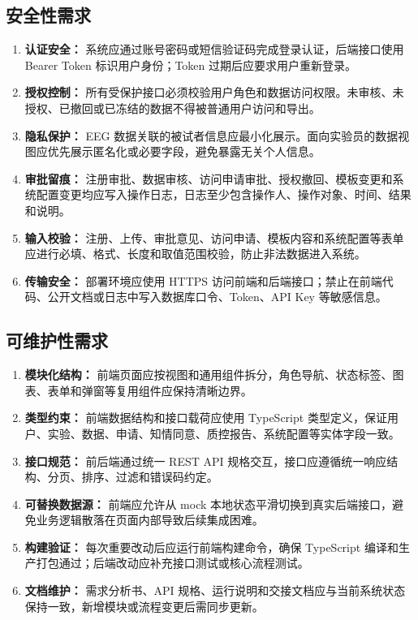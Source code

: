 \subsection{安全性需求}

\begin{enumerate}
  \item \textbf{认证安全：} 系统应通过账号密码或短信验证码完成登录认证，后端接口使用 Bearer Token 标识用户身份；Token 过期后应要求用户重新登录。
  \item \textbf{授权控制：} 所有受保护接口必须校验用户角色和数据访问权限。未审核、未授权、已撤回或已冻结的数据不得被普通用户访问和导出。
  \item \textbf{隐私保护：} EEG 数据关联的被试者信息应最小化展示。面向实验员的数据视图应优先展示匿名化或必要字段，避免暴露无关个人信息。
  \item \textbf{审批留痕：} 注册审批、数据审核、访问申请审批、授权撤回、模板变更和系统配置变更均应写入操作日志，日志至少包含操作人、操作对象、时间、结果和说明。
  \item \textbf{输入校验：} 注册、上传、审批意见、访问申请、模板内容和系统配置等表单应进行必填、格式、长度和取值范围校验，防止非法数据进入系统。
  \item \textbf{传输安全：} 部署环境应使用 HTTPS 访问前端和后端接口；禁止在前端代码、公开文档或日志中写入数据库口令、Token、API Key 等敏感信息。
\end{enumerate}

\subsection{可维护性需求}

\begin{enumerate}
  \item \textbf{模块化结构：} 前端页面应按视图和通用组件拆分，角色导航、状态标签、图表、表单和弹窗等复用组件应保持清晰边界。
  \item \textbf{类型约束：} 前端数据结构和接口载荷应使用 TypeScript 类型定义，保证用户、实验、数据、申请、知情同意、质控报告、系统配置等实体字段一致。
  \item \textbf{接口规范：} 前后端通过统一 REST API 规格交互，接口应遵循统一响应结构、分页、排序、过滤和错误码约定。
  \item \textbf{可替换数据源：} 前端应允许从 mock 本地状态平滑切换到真实后端接口，避免业务逻辑散落在页面内部导致后续集成困难。
  \item \textbf{构建验证：} 每次重要改动后应运行前端构建命令，确保 TypeScript 编译和生产打包通过；后端改动应补充接口测试或核心流程测试。
  \item \textbf{文档维护：} 需求分析书、API 规格、运行说明和交接文档应与当前系统状态保持一致，新增模块或流程变更后需同步更新。
\end{enumerate}
